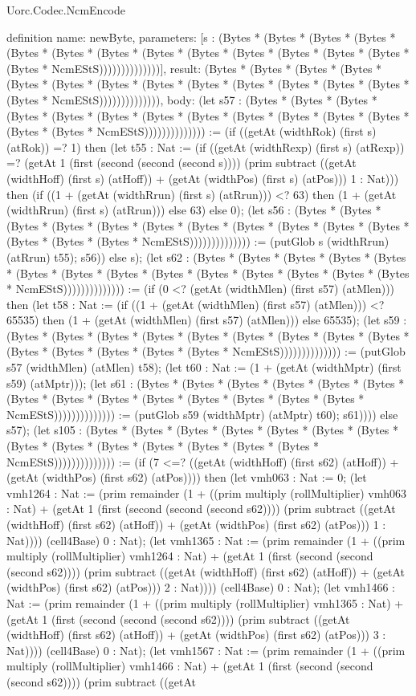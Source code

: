 \begin{lexlean}{Uorc.Codec.NcmEncode}
\begin{semanticmodule}
definition{
  name: newByte,
  parameters: [s : (Bytes * (Bytes * (Bytes * (Bytes * (Bytes * (Bytes * (Bytes * (Bytes * (Bytes * (Bytes * (Bytes * (Bytes * (Bytes * (Bytes * NcmEStS))))))))))))))],
  result: (Bytes * (Bytes * (Bytes * (Bytes * (Bytes * (Bytes * (Bytes * (Bytes * (Bytes * (Bytes * (Bytes * (Bytes * (Bytes * (Bytes * NcmEStS)))))))))))))),
  body: (let s57 : (Bytes * (Bytes * (Bytes * (Bytes * (Bytes * (Bytes * (Bytes * (Bytes * (Bytes * (Bytes * (Bytes * (Bytes * (Bytes * (Bytes * NcmEStS)))))))))))))) := (if ((getAt (widthRok) (first s) (atRok)) =? 1) then (let t55 : Nat := (if ((getAt (widthRexp) (first s) (atRexp)) =? (getAt 1 (first (second (second (second s)))) (prim subtract ((getAt (widthHoff) (first s) (atHoff)) + (getAt (widthPos) (first s) (atPos))) 1 : Nat))) then (if ((1 + (getAt (widthRrun) (first s) (atRrun))) <? 63) then (1 + (getAt (widthRrun) (first s) (atRrun))) else 63) else 0); (let s56 : (Bytes * (Bytes * (Bytes * (Bytes * (Bytes * (Bytes * (Bytes * (Bytes * (Bytes * (Bytes * (Bytes * (Bytes * (Bytes * (Bytes * NcmEStS)))))))))))))) := (putGlob s (widthRrun) (atRrun) t55); s56)) else s); (let s62 : (Bytes * (Bytes * (Bytes * (Bytes * (Bytes * (Bytes * (Bytes * (Bytes * (Bytes * (Bytes * (Bytes * (Bytes * (Bytes * (Bytes * NcmEStS)))))))))))))) := (if (0 <? (getAt (widthMlen) (first s57) (atMlen))) then (let t58 : Nat := (if ((1 + (getAt (widthMlen) (first s57) (atMlen))) <? 65535) then (1 + (getAt (widthMlen) (first s57) (atMlen))) else 65535); (let s59 : (Bytes * (Bytes * (Bytes * (Bytes * (Bytes * (Bytes * (Bytes * (Bytes * (Bytes * (Bytes * (Bytes * (Bytes * (Bytes * (Bytes * NcmEStS)))))))))))))) := (putGlob s57 (widthMlen) (atMlen) t58); (let t60 : Nat := (1 + (getAt (widthMptr) (first s59) (atMptr))); (let s61 : (Bytes * (Bytes * (Bytes * (Bytes * (Bytes * (Bytes * (Bytes * (Bytes * (Bytes * (Bytes * (Bytes * (Bytes * (Bytes * (Bytes * NcmEStS)))))))))))))) := (putGlob s59 (widthMptr) (atMptr) t60); s61)))) else s57); (let s105 : (Bytes * (Bytes * (Bytes * (Bytes * (Bytes * (Bytes * (Bytes * (Bytes * (Bytes * (Bytes * (Bytes * (Bytes * (Bytes * (Bytes * NcmEStS)))))))))))))) := (if (7 <=? ((getAt (widthHoff) (first s62) (atHoff)) + (getAt (widthPos) (first s62) (atPos)))) then (let vmh063 : Nat := 0; (let vmh1264 : Nat := (prim remainder (1 + ((prim multiply (rollMultiplier) vmh063 : Nat) + (getAt 1 (first (second (second (second s62)))) (prim subtract ((getAt (widthHoff) (first s62) (atHoff)) + (getAt (widthPos) (first s62) (atPos))) 1 : Nat)))) (cell4Base) 0 : Nat); (let vmh1365 : Nat := (prim remainder (1 + ((prim multiply (rollMultiplier) vmh1264 : Nat) + (getAt 1 (first (second (second (second s62)))) (prim subtract ((getAt (widthHoff) (first s62) (atHoff)) + (getAt (widthPos) (first s62) (atPos))) 2 : Nat)))) (cell4Base) 0 : Nat); (let vmh1466 : Nat := (prim remainder (1 + ((prim multiply (rollMultiplier) vmh1365 : Nat) + (getAt 1 (first (second (second (second s62)))) (prim subtract ((getAt (widthHoff) (first s62) (atHoff)) + (getAt (widthPos) (first s62) (atPos))) 3 : Nat)))) (cell4Base) 0 : Nat); (let vmh1567 : Nat := (prim remainder (1 + ((prim multiply (rollMultiplier) vmh1466 : Nat) + (getAt 1 (first (second (second (second s62)))) (prim subtract ((getAt }
\end{semanticmodule}
\end{lexlean}
